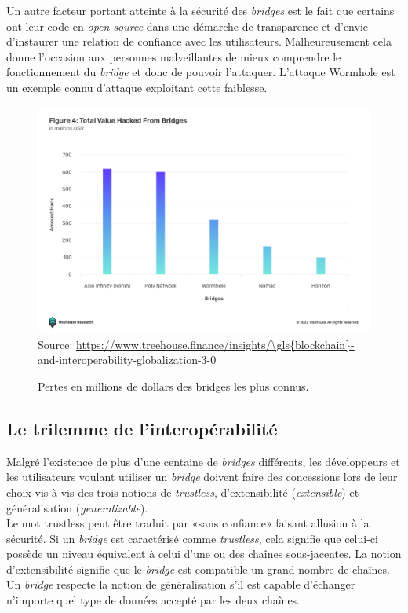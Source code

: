 Un autre facteur portant atteinte à la sécurité des \textit{bridges} est le fait que certains ont leur code en \textit{open source} dans une démarche de transparence et d’envie d’instaurer une relation de confiance avec les utilisateurs. Malheureusement cela donne l’occasion aux personnes malveillantes de mieux comprendre le fonctionnement du \textit{bridge} et donc de pouvoir l’attaquer. L’attaque Wormhole est un exemple connu d’attaque exploitant cette faiblesse.

\begin{figure}[h!]
    \centering
\includegraphics[scale=0.30]{centralisation/imagesBridges/GraphLossesBridges.png}
    {\scriptsize
            Source: \url{https://www.treehouse.finance/insights/\gls{blockchain}-and-interoperability-globalization-3-0}}
    \caption{Pertes en millions de dollars des bridges les plus connus.}
    \label{fig:GraphBridges}
\end{figure}

\subsection{Le trilemme de l’interopérabilité}

Malgré l’existence de plus d’une centaine de \textit{bridges} différents, les développeurs et les utilisateurs voulant utiliser un \textit{bridge} doivent faire des concessions lors de leur choix vis-à-vis des trois notions de \textit{trustless}, d’extensibilité (\textit{extensible}) et généralisation (\textit{generalizable}).\\

Le mot trustless peut être traduit par «sans confiance» faisant allusion à la sécurité. Si un \textit{bridge} est caractérisé comme \textit{trustless}, cela signifie que celui-ci possède un niveau équivalent à celui d’une ou des chaînes sous-jacentes.  La notion  d’extensibilité signifie que le \textit{bridge} est compatible un grand nombre de chaînes.
Un \textit{bridge} respecte la notion de généralisation s’il est capable d'échanger n’importe quel type de données accepté par les deux chaînes.\\

